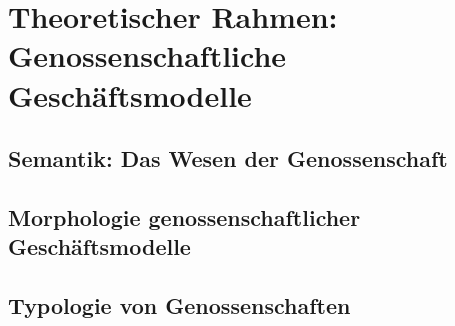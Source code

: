 \section{Theoretischer Rahmen: Genossenschaftliche Geschäftsmodelle}

\subsection{Semantik: Das Wesen der Genossenschaft}

\subsection{Morphologie genossenschaftlicher Geschäftsmodelle}

\subsection{Typologie von Genossenschaften}
